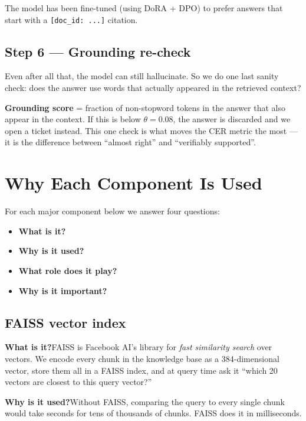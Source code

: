 \documentclass[11pt,a4paper]{article}
\begin{document}
The model has been fine-tuned (using DoRA + DPO) to prefer answers that start with a \texttt{[doc\_id: ...]} citation.

\subsection{Step 6 --- Grounding re-check}

\begin{keyidea}
Even after all that, the model can still hallucinate. So we do one last sanity check: does the answer use words that actually appeared in the retrieved context?
\end{keyidea}

\textbf{Grounding score} = fraction of non-stopword tokens in the answer that also appear in the context. If this is below $\theta = 0.08$, the answer is discarded and we open a ticket instead. This one check is what moves the CER metric the most --- it is the difference between ``almost right'' and ``verifiably supported''.

\clearpage
\section{Why Each Component Is Used}
\label{sec:components}

For each major component below we answer four questions:
\begin{itemize}[leftmargin=*, itemsep=1pt, topsep=2pt]
\item \textbf{What is it?}
\item \textbf{Why is it used?}
\item \textbf{What role does it play?}
\item \textbf{Why is it important?}
\end{itemize}

\subsection{FAISS vector index}

\textbf{What is it?}\quad FAISS is Facebook AI's library for \emph{fast similarity search} over vectors. We encode every chunk in the knowledge base as a 384-dimensional vector, store them all in a FAISS index, and at query time ask it ``which 20 vectors are closest to this query vector?''

\textbf{Why is it used?}\quad Without FAISS, comparing the query to every single chunk would take seconds for tens of thousands of chunks. FAISS does it in milliseconds.
\end{document}
